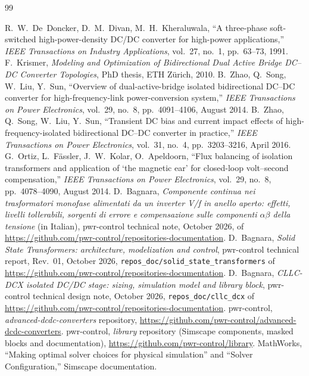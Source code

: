 \documentclass[12pt,a4paper]{scrartcl}
\newcommand{\code}[1]{\texttt{#1}}
\begin{document}
\begin{onehalfspace}
\begin{thebibliography}{99}\raggedright
	 R.~W.~De~Doncker, D.~M.~Divan, M.~H.~Kheraluwala, ``A three-phase soft-switched high-power-density DC/DC converter for high-power applications,'' \textit{IEEE Transactions on Industry Applications}, vol.~27, no.~1, pp.~63--73, 1991.
	 F.~Krismer, \textit{Modeling and Optimization of Bidirectional Dual Active Bridge DC--DC Converter Topologies}, PhD thesis, ETH Z\"urich, 2010.
	 B.~Zhao, Q.~Song, W.~Liu, Y.~Sun, ``Overview of dual-active-bridge isolated bidirectional DC--DC converter for high-frequency-link power-conversion system,'' \textit{IEEE Transactions on Power Electronics}, vol.~29, no.~8, pp.~4091--4106, August 2014.
	 B.~Zhao, Q.~Song, W.~Liu, Y.~Sun, ``Transient DC bias and current impact effects of high-frequency-isolated bidirectional DC--DC converter in practice,'' \textit{IEEE Transactions on Power Electronics}, vol.~31, no.~4, pp.~3203--3216, April 2016.
	 G.~Ortiz, L.~F\"assler, J.~W.~Kolar, O.~Apeldoorn, ``Flux balancing of isolation transformers and application of `the magnetic ear' for closed-loop volt--second compensation,'' \textit{IEEE Transactions on Power Electronics}, vol.~29, no.~8, pp.~4078--4090, August 2014.
	 D.~Bagnara, \textit{Componente continua nei trasformatori monofase alimentati da un inverter V/f in anello aperto: effetti, livelli tollerabili, sorgenti di errore e compensazione sulle componenti $\alpha\beta$ della tensione} (in Italian), pwr-control technical note, October 2026,  of \url{https://github.com/pwr-control/repositories-documentation}.
	 D.~Bagnara, \textit{Solid State Transformers: architecture, modelization and control}, pwr-control technical report, Rev.~01, October 2026, \code{repos\_doc/solid\_state\_transformers} of \url{https://github.com/pwr-control/repositories-documentation}.
	 D.~Bagnara, \textit{CLLC-DCX isolated DC/DC stage: sizing, simulation model and library block}, pwr-control technical design note, October 2026, \code{repos\_doc/cllc\_dcx} of \url{https://github.com/pwr-control/repositories-documentation}.
	 pwr-control, \textit{advanced-dcdc-converters} repository, \url{https://github.com/pwr-control/advanced-dcdc-converters}.
	 pwr-control, \textit{library} repository (Simscape components, masked blocks and documentation), \url{https://github.com/pwr-control/library}.
	 MathWorks, ``Making optimal solver choices for physical simulation'' and ``Solver Configuration,'' Simscape documentation.
\end{thebibliography}

\end{onehalfspace}
\end{document}
